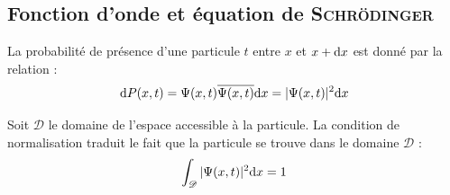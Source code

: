 \documentclass[11pt,a4paper,fleqn,pdftex]{report}
\begin{document}
\subsection{Fonction d'onde et équation de \textsc{Schrödinger}} %
\label{sub:fonction_d_onde_et_equation_de_schrodinger}
\begin{dfn}
   La probabilité de présence d'une particule $t$ entre $x$ et $x+\mathrm{d} x$ est donné par la relation : 
   \begin{equation}
   \mathrm{d} P(x,t) = \Psi (x,t) \overline{\Psi (x,t)} \mathrm{d} x = |\Psi (x,t) |^2 \mathrm{d} x
   \end{equation}
\end{dfn}
\begin{itheorem}
   Soit $\mathscr{D}$ le domaine de l'espace accessible à la particule. La condition de normalisation traduit le fait que la particule se trouve  dans le domaine $\mathscr{D}$ : 
   \begin{equation}
   \int_\mathscr{D} |\Psi (x,t) |^2 \mathrm{d} x = 1
   \end{equation}
\end{itheorem}
\end{document}

